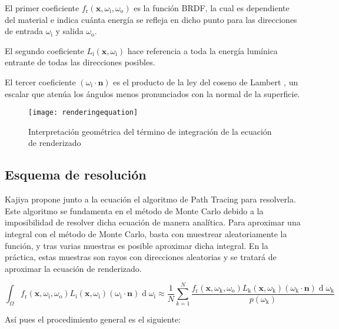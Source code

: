 El primer coeficiente $f_{\text{r}}(\mathbf {x} ,\omega _{\text{i}},\omega _{\text{o}})$ es la función BRDF, la cual es dependiente del material e indica cuánta energía se refleja en dicho punto para las direcciones de entrada $\omega _{\text{i}}$ y salida $\omega _{\text{o}}$.

El segundo coeficiente $L_{\text{i}}(\mathbf {x} ,\omega _{\text{i}})$ hace referencia a toda la energía lumínica entrante de todas las direcciones posibles.

El tercer coeficiente $(\omega _{\text{i}}\cdot \mathbf {n})$ es el producto de la ley del coseno de Lambert \cite{lambert1760jh}, un escalar que atenúa los ángulos menos pronunciados con la normal de la superficie.

\begin{figure}[H]
    \centering
	\texttt{[image: renderingequation]}
	\caption{Interpretación geométrica del término de integración de la ecuación de renderizado}
	\label{fig:renderingequation}
\end{figure}


	\subsection{Esquema de resolución}
	\label{subsec:montecarlo}
Kajiya \cite{kajiya1986rendering} propone junto a la ecuación el algoritmo de Path Tracing para resolverla. Este algoritmo se fundamenta en el método de Monte Carlo debido a la imposibilidad de resolver dicha ecuación de manera analítica.
Para aproximar una integral con el método de Monte Carlo, basta con muestrear aleatoriamente la función, y tras varias muestras es posible aproximar dicha integral. En la práctica, estas muestras son rayos con direcciones aleatorias y se tratará de aproximar la ecuación de renderizado. 

\[
{\int _{\Omega }f_{\text{r}}(\mathbf {x} ,\omega _{\text{i}},\omega _{\text{o}})L_{\text{i}}(\mathbf {x} ,\omega _{\text{i}})(\omega _{\text{i}}\cdot \mathbf {n} )\operatorname {d} \omega _{\text{i}} \approx \displaystyle \frac{1}{N}\sum\limits_{k=1}^{N}\frac{f_{\text{r}}(\mathbf {x} ,\omega _{\text{k}},\omega _{\text{o}})L_{\text{k}}(\mathbf {x} ,\omega _{\text{k}})(\omega _{\text{k}}\cdot \mathbf {n} )\operatorname {d} \omega _{\text{k}}}{p(\omega _{\text{k}})}}
\]

Así pues el procedimiento general es el siguiente:

